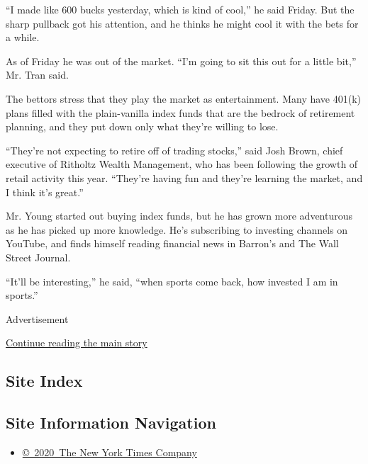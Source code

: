 ``I made like 600 bucks yesterday, which is kind of cool,'' he said
Friday. But the sharp pullback got his attention, and he thinks he might
cool it with the bets for a while.

As of Friday he was out of the market. ``I'm going to sit this out for a
little bit,'' Mr. Tran said.

The bettors stress that they play the market as entertainment. Many have
401(k) plans filled with the plain-vanilla index funds that are the
bedrock of retirement planning, and they put down only what they're
willing to lose.

``They're not expecting to retire off of trading stocks,'' said Josh
Brown, chief executive of Ritholtz Wealth Management, who has been
following the growth of retail activity this year. ``They're having fun
and they're learning the market, and I think it's great.''

Mr. Young started out buying index funds, but he has grown more
adventurous as he has picked up more knowledge. He's subscribing to
investing channels on YouTube, and finds himself reading financial news
in Barron's and The Wall Street Journal.

``It'll be interesting,'' he said, ``when sports come back, how invested
I am in sports.''

Advertisement

\protect\hyperlink{after-bottom}{Continue reading the main story}

\hypertarget{site-index}{%
\subsection{Site Index}\label{site-index}}

\hypertarget{site-information-navigation}{%
\subsection{Site Information
Navigation}\label{site-information-navigation}}

\begin{itemize}
\tightlist
\item
  \href{https://help.nytimes3xbfgragh.onion/hc/en-us/articles/115014792127-Copyright-notice}{©~2020~The
  New York Times Company}
\end{itemize}

